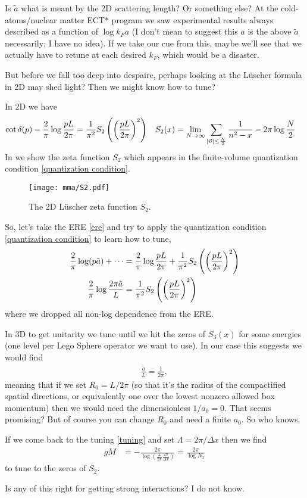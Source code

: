 Is $\tilde{a}$ what is meant by the 2D scattering length?  Or something else?
At the cold-atoms/nuclear matter ECT* program we saw experimental results always described as a function of $\log k_F a$ (I don't mean to suggest this $a$ is the above $\tilde{a}$ necessarily; I have no idea).
If we take our cue from this, maybe we'll see that we actually have to retune at each desired $k_F$, which would be a disaster.

But before we fall too deep into despaire, perhaps looking at the L\"{u}scher formula in 2D may shed light?
Then we might know how to tune?

In 2D we have
\begin{align}
	\cot \delta(p) - \frac{2}{\pi} \log \frac{pL}{2\pi} &= \frac{1}{\pi^2} S_2\left(\left(\frac{pL}{2\pi}\right)^2\right)
	&	
	S_2(x) &= \lim_{N\rightarrow\infty} \sum_{\left| \vec{n} \right| \leq \frac{N}{2}} \frac{1}{n^2-x} - 2\pi \log \frac{N}{2}
	\label{eq:quantization condition}
\end{align}
In  we show the zeta function $S_2$ which appears in the finite-volume quantization condition \eqref{quantization condition}.
\begin{figure}
	\texttt{[image: mma/S2.pdf]}
	\caption{The 2D L\"{u}scher zeta function $S_2$.}
	\label{fig:S2}
\end{figure}

So, let's take the ERE \eqref{ere} and try to apply the quantization condition \eqref{quantization condition} to learn how to tune,
\begin{align}
	\frac{2}{\pi} \log(p \tilde{a}) + \cdots
	&=
	\frac{2}{\pi} \log \frac{pL}{2\pi} + \frac{1}{\pi^2} S_2\left(\left(\frac{pL}{2\pi}\right)^2\right)
	\\
	\frac{2}{\pi} \log \frac{2\pi \tilde{a}}{L} &= \frac{1}{\pi^2} S_2\left(\left(\frac{pL}{2\pi}\right)^2\right)
\end{align}
where we dropped all non-log dependence from the ERE.

In 3D to get unitarity we tune until we hit the zeros of $S_3(x)$ for some energies (one level per Lego Sphere operator we want to use).
In our case this suggests we would find
\begin{align}
	\frac{\tilde{a}}{L} = \frac{1}{2\pi},
\end{align}
meaning that if we set $R_0=L/2\pi$ (so that it's the radius of the compactified spatial directions, or equivalently one over the lowest nonzero allowed box momentum) then we would need the dimensionless $1/a_0 = 0$.
That seems promising?
But of course you can change $R_0$ and need a finite $a_0$.
So who knows.

If we come back to the tuning \eqref{tuning} and set $\Lambda=2\pi/\Delta x$ then we find
\begin{align}
	gM &= - \frac{2\pi}{\log\left(\frac{L}{2\pi} \frac{2\pi}{\Delta x}\right)} = \frac{2\pi}{\log N_x}
\end{align}
to tune to the zeros of $S_2$.

Is any of this right for getting strong interactions?  I do not know.
